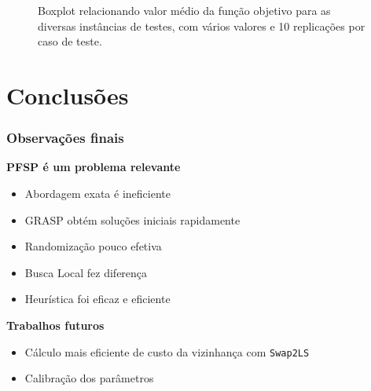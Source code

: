 \documentclass[professionalfonts]{beamer}
\begin{document}
\begin{frame}
\begin{figure}
{         
      }
      \caption{Boxplot relacionando valor médio da função objetivo para as diversas 
         instâncias de testes, com vários valores \bm{$\alpha$} e 10 replicações
         por caso de teste.}
   \end{figure}

\end{frame}

\section{Conclusões}

\begin{frame}
   \frametitle{Observações finais}

   \textbf{PFSP é um problema relevante}
   \begin{itemize}
      \item Abordagem exata é ineficiente
      \item GRASP obtém soluções iniciais rapidamente
      \item Randomização pouco efetiva
      \item Busca Local fez diferença
      \item Heurística foi eficaz e eficiente
   \end{itemize}

   \medskip
   \textbf{Trabalhos futuros}
   \begin{itemize}
      \item Cálculo mais eficiente de custo da vizinhança com \texttt{Swap2LS}
      \item Calibração dos parâmetros
   \end{itemize}

\end{frame}
\end{document}
